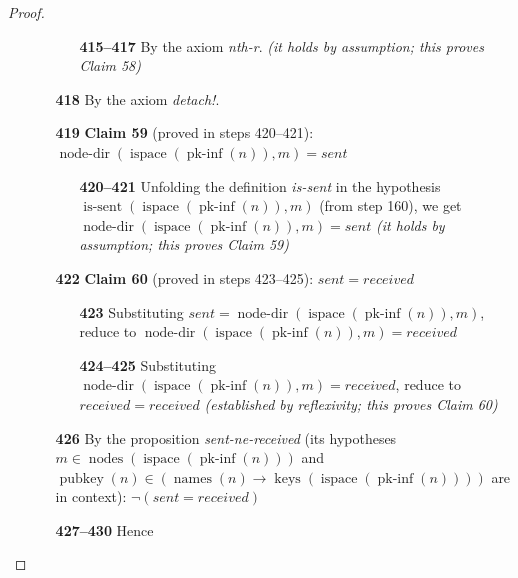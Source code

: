 \documentclass[11pt]{article}
\theoremstyle{plain}
\begin{document}
\begin{proof}
\begin{itemize}[leftmargin=2.8em, itemsep=4pt, parsep=1pt]
\begin{itemize}[leftmargin=2.8em, itemsep=4pt, parsep=1pt]
  \begin{itemize}[leftmargin=2.8em, itemsep=4pt, parsep=1pt]
  \item[\textbf{415--417}] By the axiom \emph{nth-r}.  \emph{(it holds by assumption; this proves Claim 58)}
  \end{itemize}
  \item[\textbf{418}] By the axiom \emph{detach!}.
  \item[\textbf{419}] \textbf{Claim 59} (proved in steps 420--421): $\operatorname{node\text{-}dir}(\operatorname{ispace}(\operatorname{pk\text{-}inf}(n)), m) = \mathit{sent}$
  \begin{itemize}[leftmargin=2.8em, itemsep=4pt, parsep=1pt]
  \item[\textbf{420--421}] Unfolding the definition \emph{is-sent} in the hypothesis $\operatorname{is\text{-}sent}(\operatorname{ispace}(\operatorname{pk\text{-}inf}(n)), m)$ (from step 160), we get $\operatorname{node\text{-}dir}(\operatorname{ispace}(\operatorname{pk\text{-}inf}(n)), m) = \mathit{sent}$  \emph{(it holds by assumption; this proves Claim 59)}
  \end{itemize}
  \item[\textbf{422}] \textbf{Claim 60} (proved in steps 423--425): $\mathit{sent} = \mathit{received}$
  \begin{itemize}[leftmargin=2.8em, itemsep=4pt, parsep=1pt]
  \item[\textbf{423}] Substituting $\mathit{sent} = \operatorname{node\text{-}dir}(\operatorname{ispace}(\operatorname{pk\text{-}inf}(n)), m)$, reduce to $\operatorname{node\text{-}dir}(\operatorname{ispace}(\operatorname{pk\text{-}inf}(n)), m) = \mathit{received}$
  \item[\textbf{424--425}] Substituting $\operatorname{node\text{-}dir}(\operatorname{ispace}(\operatorname{pk\text{-}inf}(n)), m) = \mathit{received}$, reduce to $\mathit{received} = \mathit{received}$  \emph{(established by reflexivity; this proves Claim 60)}
  \end{itemize}
  \item[\textbf{426}] By the proposition \emph{sent-ne-received} (its hypotheses $m \in \operatorname{nodes}(\operatorname{ispace}(\operatorname{pk\text{-}inf}(n)))$ and $\operatorname{pubkey}(n) \in (\operatorname{names}(n) \to \operatorname{keys}(\operatorname{ispace}(\operatorname{pk\text{-}inf}(n))))$ are in context): $\neg (\mathit{sent} = \mathit{received})$
  \item[\textbf{427--430}] Hence 
\begin{equation*}

\end{equation*}
\end{itemize}
\end{itemize}
\end{proof}
\end{document}
